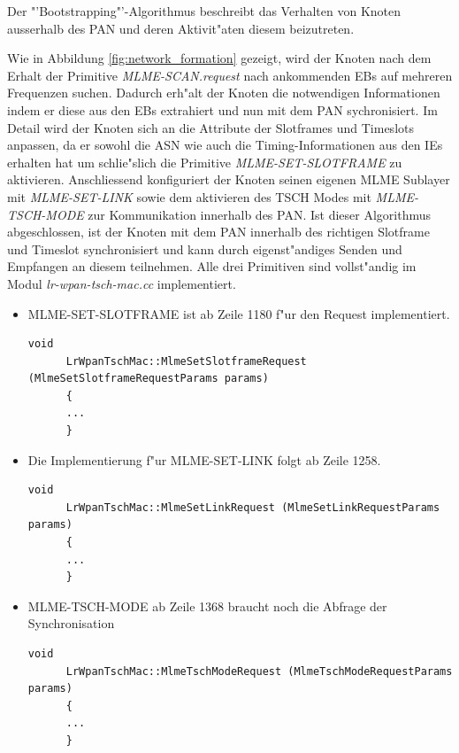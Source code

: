 Der "'Bootstrapping"'-Algorithmus beschreibt das Verhalten von Knoten ausserhalb
des PAN und deren Aktivit"aten diesem beizutreten.

Wie in Abbildung \ref{fig:network_formation} gezeigt, wird der Knoten nach dem
Erhalt der Primitive \textit{MLME-SCAN.request} nach ankommenden EBs auf mehreren
Frequenzen suchen. Dadurch erh"alt der Knoten die notwendigen Informationen
indem er diese aus den EBs extrahiert und nun mit dem PAN sychronisiert.
Im Detail wird der Knoten sich an die Attribute der Slotframes und Timeslots anpassen,
da er sowohl die ASN wie auch die Timing-Informationen aus den IEs erhalten hat
um schlie"slich die Primitive \textit{MLME-SET-SLOTFRAME} zu aktivieren.
Anschliessend konfiguriert der Knoten seinen eigenen MLME Sublayer
mit \textit{MLME-SET-LINK} sowie dem aktivieren des TSCH Modes mit
\textit{MLME-TSCH-MODE} zur Kommunikation innerhalb des PAN.
Ist dieser Algorithmus abgeschlossen, ist der Knoten mit dem PAN innerhalb des
richtigen Slotframe und Timeslot synchronisiert und kann durch eigenst"andiges Senden
und Empfangen an diesem teilnehmen. Alle drei Primitiven sind vollst"andig im Modul
\textit{lr-wpan-tsch-mac.cc} implementiert.

\begin{itemize}
  \item MLME-SET-SLOTFRAME ist ab Zeile 1180 f"ur den Request implementiert.
    \begin{lstlisting}[frame=single]
      void
      LrWpanTschMac::MlmeSetSlotframeRequest (MlmeSetSlotframeRequestParams params)
      {
      ...
      }
    \end{lstlisting}
  \item Die Implementierung f"ur MLME-SET-LINK folgt ab Zeile 1258.
    \begin{lstlisting}[frame=single]
      void
      LrWpanTschMac::MlmeSetLinkRequest (MlmeSetLinkRequestParams params)
      {
      ...
      }
    \end{lstlisting}
  \item MLME-TSCH-MODE ab Zeile 1368 braucht noch die Abfrage der Synchronisation
    \begin{lstlisting}[frame=single]
      void
      LrWpanTschMac::MlmeTschModeRequest (MlmeTschModeRequestParams params)
      {
      ...
      }
    \end{lstlisting}
\end{itemize}

